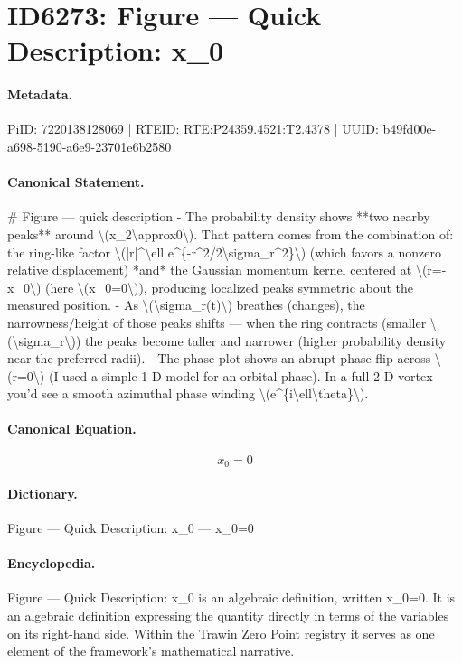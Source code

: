 \section*{ID6273: Figure — Quick Description: x\_0}
\paragraph{Metadata.}
PiID: 7220138128069 | RTEID: RTE:P24359.4521:T2.4378 | UUID: b49fd00e-a698-5190-a6e9-23701e6b2580

\paragraph{Canonical Statement.}
\# Figure — quick description - The probability density shows **two nearby peaks** around \textbackslash{}(x\_2\textbackslash{}approx0\textbackslash{}). That pattern comes from the combination of: the ring-like factor \textbackslash{}(|r|\textasciicircum{}\textbackslash{}ell e\textasciicircum{}\{-r\textasciicircum{}2/2\textbackslash{}sigma\_r\textasciicircum{}2\}\textbackslash{}) (which favors a nonzero relative displacement) *and* the Gaussian momentum kernel centered at \textbackslash{}(r=-x\_0\textbackslash{}) (here \textbackslash{}(x\_0=0\textbackslash{})), producing localized peaks symmetric about the measured position. - As \textbackslash{}(\textbackslash{}sigma\_r(t)\textbackslash{}) breathes (changes), the narrowness/height of those peaks shifts — when the ring contracts (smaller \textbackslash{}(\textbackslash{}sigma\_r\textbackslash{})) the peaks become taller and narrower (higher probability density near the preferred radii). - The phase plot shows an abrupt phase flip across \textbackslash{}(r=0\textbackslash{}) (I used a simple 1-D model for an orbital phase). In a full 2-D vortex you’d see a smooth azimuthal phase winding \textbackslash{}(e\textasciicircum{}\{i\textbackslash{}ell\textbackslash{}theta\}\textbackslash{}).

\paragraph{Canonical Equation.}
\[
x_0=0
\]

\paragraph{Dictionary.}
Figure — Quick Description: x\_0 — x\_0=0

\paragraph{Encyclopedia.}
Figure — Quick Description: x\_0 is an algebraic definition, written x\_0=0. It is an algebraic definition expressing the quantity directly in terms of the variables on its right-hand side. Within the Trawin Zero Point registry it serves as one element of the framework's mathematical narrative.
